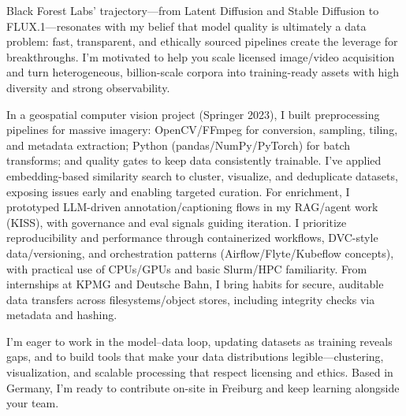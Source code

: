 Black Forest Labs’ trajectory—from Latent Diffusion and Stable Diffusion to FLUX.1—resonates with my belief that model quality is ultimately a data problem: fast, transparent, and ethically sourced pipelines create the leverage for breakthroughs. I’m motivated to help you scale licensed image/video acquisition and turn heterogeneous, billion-scale corpora into training-ready assets with high diversity and strong observability.

In a geospatial computer vision project (Springer 2023), I built preprocessing pipelines for massive imagery: OpenCV/FFmpeg for conversion, sampling, tiling, and metadata extraction; Python (pandas/NumPy/PyTorch) for batch transforms; and quality gates to keep data consistently trainable. I’ve applied embedding-based similarity search to cluster, visualize, and deduplicate datasets, exposing issues early and enabling targeted curation. For enrichment, I prototyped LLM-driven annotation/captioning flows in my RAG/agent work (KISS), with governance and eval signals guiding iteration. I prioritize reproducibility and performance through containerized workflows, DVC-style data/versioning, and orchestration patterns (Airflow/Flyte/Kubeflow concepts), with practical use of CPUs/GPUs and basic Slurm/HPC familiarity. From internships at KPMG and Deutsche Bahn, I bring habits for secure, auditable data transfers across filesystems/object stores, including integrity checks via metadata and hashing.

I’m eager to work in the model–data loop, updating datasets as training reveals gaps, and to build tools that make your data distributions legible—clustering, visualization, and scalable processing that respect licensing and ethics. Based in Germany, I’m ready to contribute on-site in Freiburg and keep learning alongside your team.